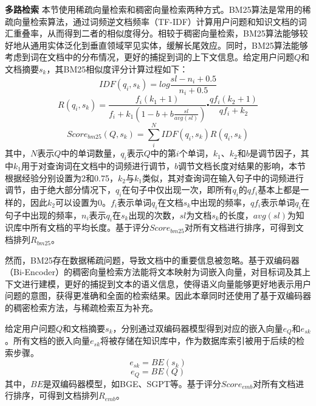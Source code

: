 \textbf{多路检索} 本节使用稀疏向量检索和稠密向量检索两种方式。BM25算法是常用的稀疏向量检索算法，通过词频逆文档频率（TF-IDF）计算用户问题和知识文档的词汇重叠率，从而得到二者的相似度得分。相较于稠密向量检索，BM25算法能够较好地从通用实体泛化到垂直领域罕见实体，缓解长尾效应。同时，BM25算法能够考虑到词在文档中的分布情况，更好的捕捉到词的上下文信息。给定用户问题$Q$和文档摘要$s_k$，其BM25相似度评分计算过程如下：
\begin{equation}
	IDF(q_i, s_k) = log\frac{sl-n_i+0.5}{n_i+0.5}
\end{equation}
\begin{equation}
	R(q_i, s_k) = \frac{f_i(k_1+1)}{f_i + k_1(1 - b + b\frac{sl}{avg(sl)})}\centerdot\frac{qf_i(k_2+1)}{qf_i+k_2}
\end{equation}
\begin{equation}
	Score_{bm25}(Q, s_k) = \sum_{i}^{N}IDF(q_i, s_k)R(q_i, s_k)
\end{equation}
其中，$N$表示$Q$中的单词数量，$q_i$表示$Q$中的第$i$个单词，$k_1$、$k_2$和$b$是调节因子，其中$k_1$用于对查询词在文档中的词频进行调节，$b$调节文档长度对结果的影响，本节根据经验分别设置为2和0.75，$k_2$与$k_1$类似，其对查询词在输入句子中的词频进行调节，由于绝大部分情况下，$q_i$在句子中仅出现一次，即所有$q_i$的$qf_i$基本上都是一样的，因此$k_2$可以设置为0。$f_i$表示单词$q_i$在文档$s_k$中出现的频率，$qf_i$表示单词$q_i$在句子中出现的频率，$n_i$表示$q_i$在$s_k$出现的次数，$sl$为文档$s_k$的长度，$avg(sl)$为知识库中所有文档的平均长度。基于评分$Score_{bm25}$对所有文档进行排序，可得到文档排列$R_{bm25}$。

然而，BM25存在数据稀疏问题，导致文档中的重要信息被忽略。基于双编码器（Bi-Encoder）的稠密向量检索方法能将文本映射为词嵌入向量，对目标词及其上下文进行建模，更好的捕捉到文本的语义信息，使得语义向量能够更好地表示用户问题的意图，获得更准确和全面的检索结果。因此本章同时还使用了基于双编码器的稠密检索方法，与稀疏检索互为补充。

给定用户问题$Q$和文档摘要$s_k$，分别通过双编码器模型得到对应的嵌入向量$e_Q$和$e_{sk}$。所有文档的嵌入向量$e_{sk}$将被存储在知识库中，作为数据库索引被用于后续的检索步骤。
\begin{equation}
	e_{sk} = BE(s_k)
\end{equation}
\begin{equation}
	e_Q = BE(Q)
\end{equation}
其中，$BE$是双编码器模型，如BGE\cite{DBLP:journals/corr/abs-2309-07597}、SGPT\cite{DBLP:journals/corr/abs-2202-08904}等。基于评分$Score_{emb}$对所有文档进行排序，可得到文档排列$R_{emb}$。

